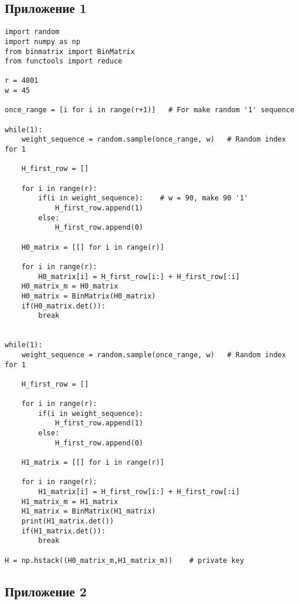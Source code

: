 \documentclass[12pt]{article}
\begin{document}
\subsection{Приложение 1}
\begin{verbatim}
import random
import numpy as np
from binmatrix import BinMatrix
from functools import reduce

r = 4801
w = 45

once_range = [i for i in range(r+1)]   # For make random '1' sequence

while(1):
    weight_sequence = random.sample(once_range, w)   # Random index for 1

    H_first_row = []

    for i in range(r):
        if(i in weight_sequence):    # w = 90, make 90 '1'
            H_first_row.append(1)
        else:
            H_first_row.append(0)

    H0_matrix = [[] for i in range(r)]

    for i in range(r):
        H0_matrix[i] = H_first_row[i:] + H_first_row[:i]
    H0_matrix_m = H0_matrix
    H0_matrix = BinMatrix(H0_matrix)
    if(H0_matrix.det()):
        break


while(1):
    weight_sequence = random.sample(once_range, w)   # Random index for 1

    H_first_row = []

    for i in range(r):
        if(i in weight_sequence):
            H_first_row.append(1)
        else:
            H_first_row.append(0)

    H1_matrix = [[] for i in range(r)]

    for i in range(r):
        H1_matrix[i] = H_first_row[i:] + H_first_row[:i]
    H1_matrix_m = H1_matrix
    H1_matrix = BinMatrix(H1_matrix)
    print(H1_matrix.det())
    if(H1_matrix.det()):
        break

H = np.hstack((H0_matrix_m,H1_matrix_m))    # private key

\end{verbatim}

\subsection{Приложение 2}
\end{document}
